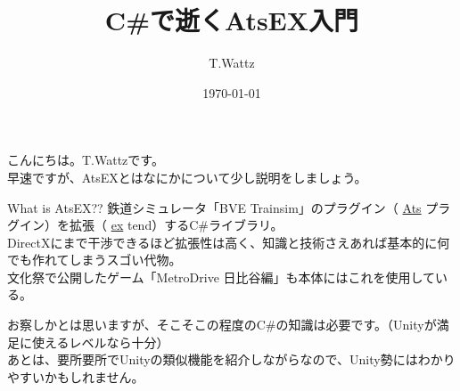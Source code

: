 \documentclass[b5paper,9pt,platex,dvipdfmx]{jsarticle}
\begin{document}
\title{C\#で逝くAtsEX入門}
\author{T.Wattz}
\date{\today}
\maketitle
\thispagestyle{empty}

\begin{multicols*}{3}

こんにちは。T.Wattzです。\\
早速ですが、AtsEXとはなにかについて少し説明をしましょう。\\
\begin{itembox}[c]{What is AtsEX??}
鉄道シミュレータ「BVE Trainsim」のプラグイン（ \underline{Ats} プラグイン）を拡張（ \underline{ex} tend）するC\#ライブラリ。\\
DirectXにまで干渉できるほど拡張性は高く、知識と技術さえあれば基本的に何でも作れてしまうスゴい代物。\\
文化祭で公開したゲーム「MetroDrive 日比谷編」も本体にはこれを使用している。\\
\end{itembox}
お察しかとは思いますが、そこそこの程度のC\#の知識は必要です。（Unityが満足に使えるレベルなら十分）\\
あとは、要所要所でUnityの類似機能を紹介しながらなので、Unity勢にはわかりやすいかもしれません。\\

\end{multicols*}
\end{document}
